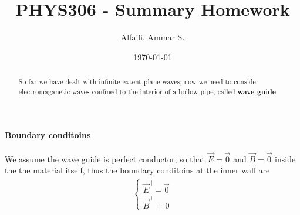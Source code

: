 \documentclass{article}
\title{PHYS306 - Summary Homework}
\author{Alfaifi, Ammar S.}
\date{\today}
\begin{document}
    \maketitle
    \begin{abstract}
        So far we have dealt with infinite-extent plane waves; now we need
        to consider electromaganetic waves confined to the interior of a hollow
        pipe, called \textbf{wave guide}
    \end{abstract}
    \paragraph{Boundary conditoins} %
    \label{par:Boundary conditoins}
        We assume the wave guide is perfect conductor, so that $\vec{E}=\vec{0}$
        and $\vec{B}=\vec{0}$ inside the the material itself, thus the boundary
        conditoins at the inner wall are
        \begin{align}
            \label{eq:boundary conditions}
            \begin{cases}
                \vec{E}^{||} = \vec{0} \\
                \vec{B}^\perp = 0
            \end{cases}
        \end{align}
\end{document}
